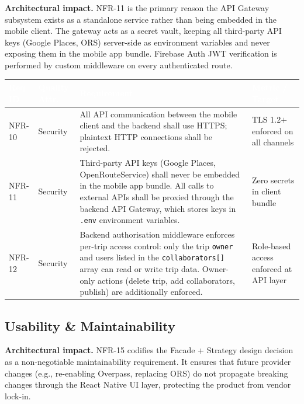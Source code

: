 \documentclass[12pt, a4paper]{article}
\newcommand{\reqid}[1]{\textsc{\small #1}}
\newcommand{\thcell}[1]{\textcolor{white}{\textbf{\small #1}}}
\begin{document}
\begin{tcolorbox}[notebox]
  \textbf{Architectural impact.} NFR-11 is the primary reason the API Gateway subsystem exists as a standalone service rather than being embedded in the mobile client. The gateway acts as a secret vault, keeping all third-party API keys (Google Places, ORS) server-side as environment variables and never exposing them in the mobile app bundle. Firebase Auth JWT verification is performed by custom middleware on every authenticated route.
\end{tcolorbox}

\vspace{0.4em}
\begin{longtable}{C{1.5cm} C{2.4cm} L{7.0cm} C{2.7cm}}
\toprule
{}
\thcell{Req ID} & \thcell{Quality Attr.} & \thcell{Requirement} & \thcell{Metric / Target} \\
\midrule
\endhead
\bottomrule
\endfoot

\reqid{NFR-10} & Security &
All API communication between the mobile client and the backend shall use HTTPS; plaintext HTTP connections shall be rejected. &
TLS 1.2$+$ enforced on all channels \\

\reqid{NFR-11} & Security &
Third-party API keys (Google Places, OpenRouteService) shall never be embedded in the mobile app bundle. All calls to external APIs shall be proxied through the backend API Gateway, which stores keys in \texttt{.env} environment variables. &
Zero secrets in client bundle \\

\reqid{NFR-12} & Security &
Backend authorisation middleware enforces per-trip access control: only the trip \texttt{owner} and users listed in the \texttt{collaborators[]} array can read or write trip data. Owner-only actions (delete trip, add collaborators, publish) are additionally enforced. &
Role-based access enforced at API layer \\

\end{longtable}

\subsection{Usability \& Maintainability}

\begin{tcolorbox}[notebox]
  \textbf{Architectural impact.} NFR-15 codifies the Facade + Strategy design decision as a non-negotiable maintainability requirement. It ensures that future provider changes (e.g., re-enabling Overpass, replacing ORS) do not propagate breaking changes through the React Native UI layer, protecting the product from vendor lock-in.
\end{tcolorbox}
\end{document}
